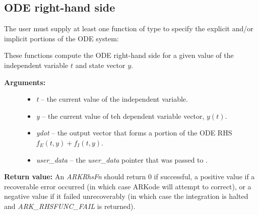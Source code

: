 \documentclass[letterpaper,10pt,english]{sphinxmanual}
\begin{document}
\subsection{ODE right-hand side}
\label{c_interface/User_supplied:ode-right-hand-side}\label{c_interface/User_supplied:cinterface-oderhs}
The user must supply at least one function of type {\hyperref[c_interface/User_supplied:c.ARKRhsFn]{\emph{}}} to
specify the explicit and/or implicit portions of the ODE system:

\begin{fulllineitems}
\label{c_interface/User_supplied:c.ARKRhsFn}
These functions compute the ODE right-hand side for a given
value of the independent variable \(t\) and state vector \(y\).
\begin{description}
\item[{\textbf{Arguments:}}] \leavevmode\begin{itemize}
\item {} 
\emph{t} -- the current value of the independent variable.

\item {} 
\emph{y} -- the current value of teh dependent variable vector, \(y(t)\).

\item {} 
\emph{ydot} -- the output vector that forms a portion of the ODE RHS \(f_E(t,y) + f_I(t,y)\).

\item {} 
\emph{user\_data} -- the \emph{user\_data} pointer that was passed to {\hyperref[c_interface/User_callable:c.ARKodeSetUserData]{\emph{}}}.

\end{itemize}

\end{description}

\textbf{Return value:}
An \emph{ARKRhsFn} should return 0 if successful, a positive value if a
recoverable error occurred (in which case ARKode will attempt to
correct), or a negative value if it failed unrecoverably (in which
case the integration is halted and \emph{ARK\_RHSFUNC\_FAIL} is returned).


\end{fulllineitems}
\end{document}
